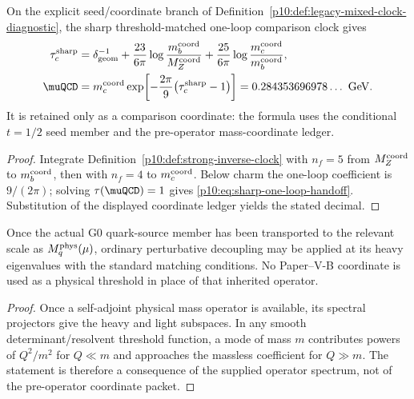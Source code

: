 \documentclass[12pt,a4paper]{article}
\providecommand{\deltageom}{\delta_{\rm geom}}
\begin{document}
\begin{theorem}
\label{p10:thm:derived-perturbative-strong-handoff}
On the explicit seed/coordinate branch of Definition~\ref{p10:def:legacy-mixed-clock-diagnostic}, the sharp threshold-matched one-loop comparison clock gives
\begin{align}
\tau_c^{\rm sharp}
&=\deltageom^{-1}
+\frac{23}{6\pi}\log\frac{m_b^{\rm coord}}{M_Z^{\rm coord}}
+\frac{25}{6\pi}\log\frac{m_c^{\rm coord}}{m_b^{\rm coord}},\\
\label{p10:eq:sharp-one-loop-handoff}
\muQCD
&=m_c^{\rm coord}\exp\!\left[-\frac{2\pi}{9}\bigl(\tau_c^{\rm sharp}-1\bigr)\right]
=0.284353696978\ldots\ \mathrm{GeV}.
\end{align}
It is retained only as a comparison coordinate: the formula uses the conditional \(t=1/2\) seed member and the pre-operator mass-coordinate ledger.
\end{theorem}
\begin{proof}
Integrate Definition~\ref{p10:def:strong-inverse-clock} with \(n_f=5\) from \(M_Z^{\rm coord}\) to \(m_b^{\rm coord}\), then with \(n_f=4\) to \(m_c^{\rm coord}\).  Below charm the one-loop coefficient is \(9/(2\pi)\); solving \(\tau(\muQCD)=1\) gives \eqref{p10:eq:sharp-one-loop-handoff}.  Substitution of the displayed coordinate ledger yields the stated decimal.
\end{proof}

\begin{theorem}
\label{p10:thm:heavy-quark-threshold-decoupling}
Once the actual G0 quark-source member has been transported to the relevant scale as \(M_q^{\rm phys}(\mu)\), ordinary perturbative decoupling may be applied at its heavy eigenvalues with the standard matching conditions.  No Paper--V-B coordinate is used as a physical threshold in place of that inherited operator.
\end{theorem}
\begin{proof}
Once a self-adjoint physical mass operator is available, its spectral projectors give the heavy and light subspaces.  In any smooth determinant/resolvent threshold function, a mode of mass $m$ contributes powers of $Q^2/m^2$ for $Q\ll m$ and approaches the massless coefficient for $Q\gg m$.  The statement is therefore a consequence of the supplied operator spectrum, not of the pre-operator coordinate packet.
\end{proof}
\end{document}
